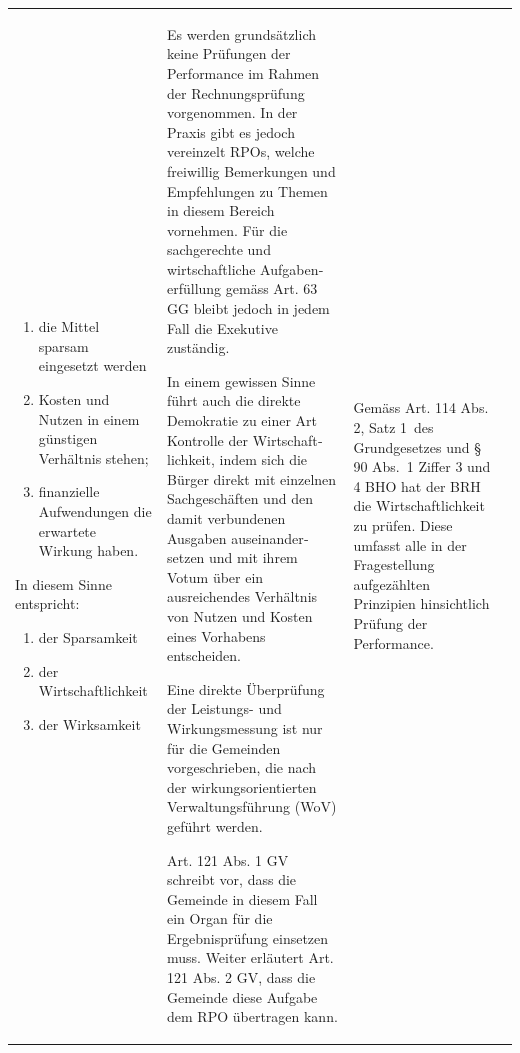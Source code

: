 \documentclass[10pt]{article}
\begin{document}
\begin{landscape}
\begin{center}
\begin{longtable}{|p{4cm}|p{5cm}|p{7.5cm}|p{7.5cm}|}
\begin{enumerate}
    \item die Mittel sparsam eingesetzt werden

    \item Kosten und Nutzen in einem günstigen Verhältnis stehen;

    \item finanzielle Aufwendungen die erwartete Wirkung haben.

\end{enumerate}

In diesem Sinne entspricht:

\begin{enumerate}
    \item der Sparsamkeit

    \item der Wirtschaftlichkeit

    \item der Wirksamkeit

\end{enumerate}

 & Es werden grundsätzlich keine Prüfungen der Performance im Rahmen der Rechnungsprüfung vorgenommen. In der Praxis gibt es jedoch vereinzelt RPOs, welche freiwillig Bemerkungen und Empfehlungen zu Themen in diesem Bereich vornehmen. Für die sachgerechte und wirtschaft­liche Aufgaben­erfüllung gemäss Art. 63 GG bleibt jedoch in jedem Fall die Exekutive zuständig. 

In einem gewissen Sinne führt auch die direkte Demokratie zu einer Art Kontrolle der Wirtschaft­lich­keit, indem sich die Bürger direkt mit einzelnen Sachge­schäften und den damit verbun­denen Ausgaben auseinander­setzen und mit ihrem Votum über ein ausreichendes Verhältnis von Nutzen und Kosten eines Vorhabens entscheiden.

Eine direkte Überprüfung der Leistungs- und Wirkungs­messung ist nur für die Gemeinden vorgeschrieben, die nach der wirkungsorientierten Verwaltungs­führung (WoV) geführt werden. 

Art. 121 Abs. 1 GV schreibt vor, dass die Gemeinde in diesem Fall ein Organ für die Ergebnisprüfung einsetzen muss. Weiter erläutert Art. 121 Abs. 2 GV, dass die Gemeinde diese Aufgabe dem RPO übertragen kann.

 & Gemäss Art. 114 Abs. 2, Satz 1~des Grundgesetzes und § 90 Abs.~1 Ziffer 3 und 4 BHO hat der BRH die Wirtschaftlichkeit zu prüfen. Diese umfasst alle in der Fragestellung aufgezählten Prinzipien hinsichtlich Prüfung der Performance.


\end{longtable}
\end{center}
\end{landscape}
\end{document}
